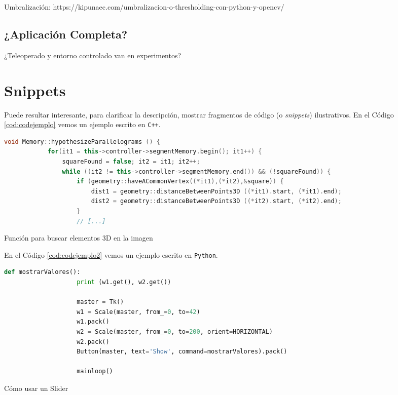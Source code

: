 Umbralización:  https://kipunaec.com/umbralizacion-o-thresholding-con-python-y-opencv/

\subsection{¿Aplicación Completa?}


¿Teleoperado y entorno controlado van en experimentos?



\section{Snippets}

Puede resultar interesante, para clarificar la descripción, mostrar fragmentos de código (o \textit{snippets}) ilustrativos. En el Código \ref{cod:codejemplo} vemos un ejemplo escrito en \texttt{C++}.

\begin{code}[h]
	\begin{lstlisting}[language=C++]
		void Memory::hypothesizeParallelograms () {
			for(it1 = this->controller->segmentMemory.begin(); it1++) {
				squareFound = false; it2 = it1; it2++;
				while ((it2 != this->controller->segmentMemory.end()) && (!squareFound)) {
					if (geometry::haveACommonVertex((*it1),(*it2),&square)) {
						dist1 = geometry::distanceBetweenPoints3D ((*it1).start, (*it1).end);
						dist2 = geometry::distanceBetweenPoints3D ((*it2).start, (*it2).end);
					}
					// [...]
				\end{lstlisting}
				\caption[Función para buscar elementos 3D en la imagen]{Función para buscar elementos 3D en la imagen}
				\label{cod:codejemplo}
			\end{code}
			
			En el Código \ref{cod:codejemplo2} vemos un ejemplo escrito en \texttt{Python}.
			
			\begin{code}[h]
				\begin{lstlisting}[language=Python]
					def mostrarValores():
					print (w1.get(), w2.get())
					
					master = Tk()
					w1 = Scale(master, from_=0, to=42)
					w1.pack()
					w2 = Scale(master, from_=0, to=200, orient=HORIZONTAL)
					w2.pack()
					Button(master, text='Show', command=mostrarValores).pack()
					
					mainloop()
				\end{lstlisting}
				\caption[Cómo usar un Slider]{Cómo usar un Slider}
				\label{cod:codejemplo2}
			\end{code}
			
